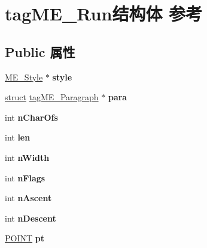 \hypertarget{structtag_m_e___run}{}\section{tag\+M\+E\+\_\+\+Run结构体 参考}
\label{structtag_m_e___run}
\subsection*{Public 属性}
\begin{DoxyCompactItemize}
\item 
\mbox{\label{structtag_m_e___run_a740e3cc7e47fb1cf4bb7fe33702afdb5}} 
\hyperlink{structtag_m_e___style}{M\+E\+\_\+\+Style} $\ast$ {\bfseries style}
\item 
\mbox{\label{structtag_m_e___run_a558af5d4fc3d78259c6f1437b03e3c9a}} 
\hyperlink{interfacestruct}{struct} \hyperlink{structtag_m_e___paragraph}{tag\+M\+E\+\_\+\+Paragraph} $\ast$ {\bfseries para}
\item 
\mbox{\label{structtag_m_e___run_a2b7c0e0b99eb820090625f176ef55c25}} 
int {\bfseries n\+Char\+Ofs}
\item 
\mbox{\label{structtag_m_e___run_ae5b8493d79c7c0c3eddc404bc76b4446}} 
int {\bfseries len}
\item 
\mbox{\label{structtag_m_e___run_a8f8560e218fed805e805a7d1924a3fd1}} 
int {\bfseries n\+Width}
\item 
\mbox{\label{structtag_m_e___run_ada7fe25668daf88378b584af4a3983e9}} 
int {\bfseries n\+Flags}
\item 
\mbox{\label{structtag_m_e___run_a034c0ae8b1617bca43d02463645c7b12}} 
int {\bfseries n\+Ascent}
\item 
\mbox{\label{structtag_m_e___run_a416a23271a5d0e786e07512f42605b64}} 
int {\bfseries n\+Descent}
\item 
\mbox{\label{structtag_m_e___run_a10168d9096f1367ecaa7127ad007a00c}} 
\hyperlink{structtag_p_o_i_n_t}{P\+O\+I\+NT} {\bfseries pt}

\end{DoxyCompactItemize}
